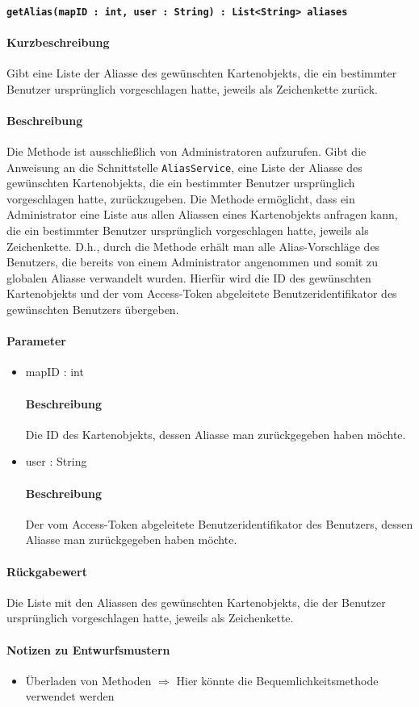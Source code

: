 \paragraph{\texttt{getAlias(mapID : int, user : String) : List<String> aliases}}%
\paragraph*{Kurzbeschreibung}
Gibt eine Liste der Aliasse des gewünschten Kartenobjekts, die ein bestimmter Benutzer ursprünglich vorgeschlagen hatte, jeweils als Zeichenkette zurück.
\paragraph*{Beschreibung}
Die Methode ist ausschließlich von Administratoren aufzurufen.
Gibt die Anweisung an die Schnittstelle \texttt{AliasService}, eine Liste der Aliasse des gewünschten Kartenobjekts, die ein bestimmter Benutzer ursprünglich vorgeschlagen hatte, zurückzugeben.
Die Methode ermöglicht, dass ein Administrator eine Liste aus allen Aliassen eines Kartenobjekts anfragen kann, die ein bestimmter Benutzer ursprünglich vorgeschlagen hatte, jeweils als Zeichenkette.
D.h., durch die Methode erhält man alle Alias-Vorschläge des Benutzers, die bereits von einem Administrator angenommen und somit zu globalen Aliasse verwandelt wurden.
Hierfür wird die ID des gewünschten Kartenobjekts und der vom Access-Token abgeleitete Benutzeridentifikator des gewünschten Benutzers übergeben.
\paragraph*{Parameter}
\begin{itemize}
    \item mapID : int
    		\paragraph*{Beschreibung}
    		Die ID des Kartenobjekts, dessen Aliasse man zurückgegeben haben möchte.
    	\item user : String
    		\paragraph*{Beschreibung}
    		Der vom Access-Token abgeleitete Benutzeridentifikator des Benutzers, dessen Aliasse man zurückgegeben haben möchte.
\end{itemize}
\paragraph*{Rückgabewert}
Die Liste mit den Aliassen des gewünschten Kartenobjekts, die der Benutzer ursprünglich vorgeschlagen hatte, jeweils als Zeichenkette.

\paragraph*{Notizen zu Entwurfsmustern}
\begin{itemize}
	\item Überladen von Methoden $\Rightarrow$ Hier könnte die Bequemlichkeitsmethode verwendet werden
\end{itemize}

